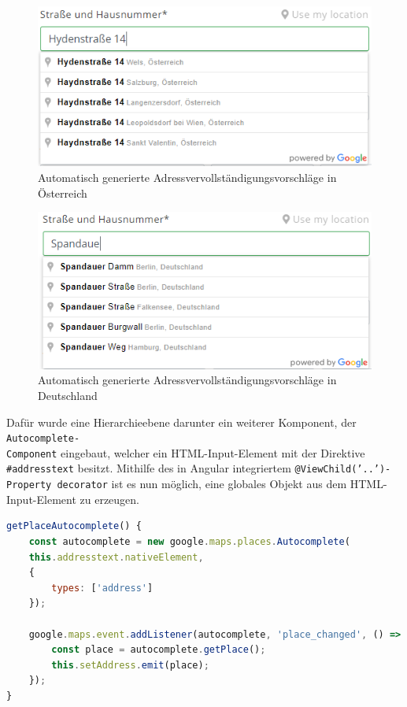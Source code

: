 \begin{figure}[H]
	\centerline{
		\includegraphics[width=1\textwidth, frame]{./grafiken/open_adress_completion.PNG}
	}
	\vskip0pt
	\caption{Automatisch generierte Adressvervollständigungsvorschläge in Österreich}
\end{figure}

\begin{figure}[H]
	\centerline{
		\includegraphics[width=1\textwidth, frame]{./grafiken/open_adress_completion_de.PNG}
	}
	\vskip0pt
	\caption{Automatisch generierte Adressvervollständigungsvorschläge in Deutschland}
\end{figure}

Dafür wurde eine Hierarchieebene darunter ein weiterer Komponent, der \texttt{Autocomplete-\\Component} eingebaut, welcher ein HTML-Input-Element mit der Direktive \texttt{\#addresstext} besitzt. Mithilfe des in Angular integriertem \texttt{@ViewChild('..')-Property decorator} ist es nun möglich, eine globales Objekt aus dem HTML-Input-Element zu erzeugen. 

\begin{lstlisting}[caption={Die \texttt{getPlaceAutocomplete()}-Methode der \texttt{AutocompleteComponent}-Klasse}, language=JavaScript,label={lst:gpac}]
getPlaceAutocomplete() {
	const autocomplete = new google.maps.places.Autocomplete(
	this.addresstext.nativeElement,
	{
		types: ['address']
	});
	
	google.maps.event.addListener(autocomplete, 'place_changed', () => {
		const place = autocomplete.getPlace();
		this.setAddress.emit(place);
	});
}
\end{lstlisting}

